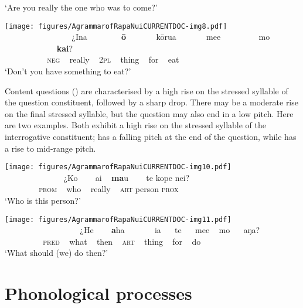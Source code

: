 \glt 
‘Are you really the one who was to come?’ \textstyleExampleref{[R630-05.019]}
\z


\ea\label{ex:2.11}
\texttt{[image: figures/AgrammarofRapaNuiCURRENTDOC-img8.pdf]}\\
\gll ~ ~ ~ ~ ~~~~~~~~~ ¿{\ꞌ}Ina ~~~~~~~ \textbf{{\ꞌ}ō} ~~~~~~ kōrua ~~~~~~ me{\ꞌ}e ~~~~~~~~ mo ~~~~~~~~~~~~ \textbf{kai}? \\
 ~ ~ ~ ~ ~ ~~\textsc{neg} ~ really ~ \textsc{2pl} ~ thing ~ for ~ eat \\

\glt 
‘Don’t you have something to eat?’ \textstyleExampleref{[R630-15.041]}
\z

Content questions () are characterised by a high rise on the stressed syllable of the question constituent, followed by a sharp drop. There may be a moderate rise on the final stressed syllable, but the question may also end in a low pitch. Here are two examples. Both exhibit a high rise on the stressed syllable of the interrogative constituent;  has a falling pitch at the end of the question, while  has a rise to mid-range pitch.

 
\ea\label{ex:2.12}
\texttt{[image: figures/AgrammarofRapaNuiCURRENTDOC-img10.pdf]}\\
\gll ~ ~ ~ ~ ~~~~~~~ ¿Ko ~~~ ai ~ \textbf{ma}u ~~~ te kope nei? \\
 ~ ~ ~ ~ ~ \textsc{prom} ~ who ~ really ~ \textsc{art} person \textsc{prox} \\

\glt 
‘Who is this person?’ \textstyleExampleref{[R630-05.063]}
\z

\ea\label{ex:2.13}
\texttt{[image: figures/AgrammarofRapaNuiCURRENTDOC-img11.pdf]}\\
\gll ~ ~ ~ ~ ~~~~~~~~~~~ ¿He ~~~ \textbf{a}ha ~~~~~~ ia ~~ te ~~ me{\ꞌ}e ~ mo ~~ aŋa? \\
 ~ ~ ~ ~ ~ ~\textsc{pred} ~ what ~ then ~ \textsc{art} ~ thing ~ for ~ do \\

\glt 
‘What should (we) do then?’ \textstyleExampleref{[R630-03.007]}\textstyleExampleref{} 
\z



\section{Phonological processes}\label{sec:2.5}

